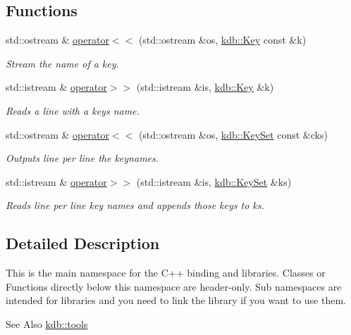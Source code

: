 \subsection*{Functions}
\begin{DoxyCompactItemize}
\item 
std\-::ostream \& \hyperlink{namespacekdb_ac004b5ba79154cbba02d5e5d83337e47}{operator$<$$<$} (std\-::ostream \&os, \hyperlink{classkdb_1_1Key}{kdb\-::\-Key} const \&k)
\begin{DoxyCompactList}\small\item\em Stream the name of a key. \end{DoxyCompactList}\item 
std\-::istream \& \hyperlink{namespacekdb_a66342865d6cdbb19075f52d92e7a61b1}{operator$>$$>$} (std\-::istream \&is, \hyperlink{classkdb_1_1Key}{kdb\-::\-Key} \&k)
\begin{DoxyCompactList}\small\item\em Reads a line with a keys name. \end{DoxyCompactList}\item 
std\-::ostream \& \hyperlink{namespacekdb_afd28754a48d420d2f2a41c5d8242f3fb}{operator$<$$<$} (std\-::ostream \&os, \hyperlink{classkdb_1_1KeySet}{kdb\-::\-Key\-Set} const \&cks)
\begin{DoxyCompactList}\small\item\em Outputs line per line the keynames. \end{DoxyCompactList}\item 
std\-::istream \& \hyperlink{namespacekdb_ac4479a9f39ed65ffd251161bcaf8ea89}{operator$>$$>$} (std\-::istream \&is, \hyperlink{classkdb_1_1KeySet}{kdb\-::\-Key\-Set} \&ks)
\begin{DoxyCompactList}\small\item\em Reads line per line key names and appends those keys to ks. \end{DoxyCompactList}\end{DoxyCompactItemize}


\subsection{Detailed Description}
This is the main namespace for the C++ binding and libraries. Classes or Functions directly below this namespace are header-\/only. Sub namespaces are intended for libraries and you need to link the library if you want to use them.
\begin{DoxyItemize}
\item \begin{DoxySeeAlso}{See Also}
\hyperlink{namespacekdb_1_1tools}{kdb\-::tools} 
\end{DoxySeeAlso}

\end{DoxyItemize}

